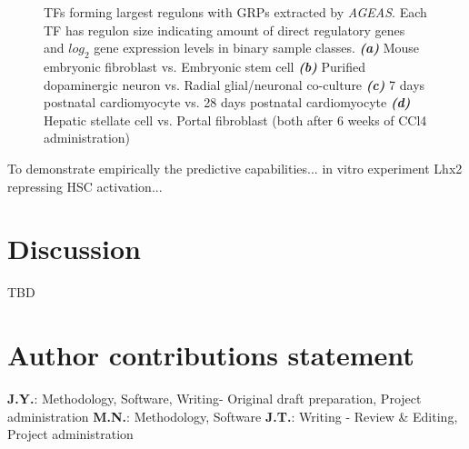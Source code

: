 \documentclass[fleqn,10pt]{wlscirep}
\begin{document}
\begin{figure}
    \caption{
      TFs forming largest regulons with GRPs extracted by \emph{AGEAS}.
      Each TF has regulon size indicating amount of direct regulatory genes and $log_2$ gene expression levels in binary sample classes.
      \textbf{\emph{(a)}} Mouse embryonic fibroblast vs. Embryonic stem cell
      \textbf{\emph{(b)}} Purified dopaminergic neuron vs. Radial glial/neuronal co-culture
      \textbf{\emph{(c)}} 7 days postnatal cardiomyocyte vs. 28 days postnatal cardiomyocyte
      \textbf{\emph{(d)}} Hepatic stellate cell vs. Portal fibroblast (both after 6 weeks of CCl4 administration)
    }
    \label{result_figs}
  \end{figure}

  \vspace{\baselineskip}
  \noindent To demonstrate empirically the predictive capabilities... in vitro experiment Lhx2 repressing HSC activation...


\section*{Discussion}
  \label{disc}
  TBD






\section*{Author contributions statement}
\textbf{J.Y.}: Methodology, Software, Writing- Original draft preparation, Project administration
\textbf{M.N.}: Methodology, Software
\textbf{J.T.}: Writing - Review \& Editing, Project administration
\end{document}
